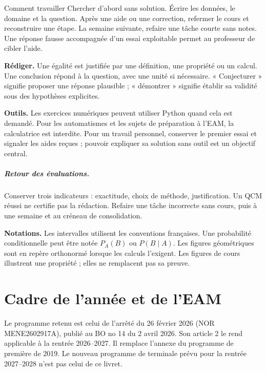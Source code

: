 \begin{repere}{Comment travailler}
Chercher d’abord sans solution. Écrire les données, le domaine et la question. Après une aide ou une correction, refermer le cours et reconstruire une étape. La semaine suivante, refaire une tâche courte sans notes. Une réponse fausse accompagnée d’un essai exploitable permet au professeur de cibler l’aide.
\end{repere}

\textbf{Rédiger.} Une égalité est justifiée par une définition, une propriété ou un calcul. Une conclusion répond à la question, avec une unité si nécessaire. « Conjecturer » signifie proposer une réponse plausible ; « démontrer » signifie établir sa validité sous des hypothèses explicites.

\textbf{Outils.} Les exercices numériques peuvent utiliser Python quand cela est demandé. Pour les automatismes et les sujets de préparation à l’EAM, la calculatrice est interdite. Pour un travail personnel, conserver le premier essai et signaler les aides reçues ; pouvoir expliquer sa solution sans outil est un objectif central.

\ifprof\paragraph{Retour des évaluations.} Conserver trois indicateurs : exactitude, choix de méthode, justification. Un QCM réussi ne certifie pas la rédaction. Refaire une tâche incorrecte sans cours, puis à une semaine et au créneau de consolidation.\fi

\textbf{Notations.} Les intervalles utilisent les conventions françaises. Une probabilité conditionnelle peut être notée $P_A(B)$ ou $P(B\mid A)$. Les figures géométriques sont en repère orthonormé lorsque les calculs l’exigent. Les figures de cours illustrent une propriété ; elles ne remplacent pas sa preuve.

\chapter*{Cadre de l’année et de l’EAM}
Le programme retenu est celui de l’arrêté du 26 février 2026 (NOR MENE2602917A), publié au BO no 14 du 2 avril 2026. Son article 2 le rend applicable à la rentrée 2026--2027. Il remplace l’annexe du programme de première de 2019. Le nouveau programme de terminale prévu pour la rentrée 2027--2028 n’est pas celui de ce livret.

